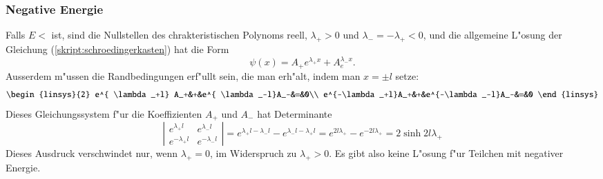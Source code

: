 \subsubsection{Negative Energie}
Falls $E<$ ist, sind die Nullstellen des chrakteristischen
Polynoms reell, $\lambda_+>0$ und $\lambda_-=-\lambda_+ < 0$,
und die allgemeine 
L"osung der Gleichung (\ref{skript:schroedingerkasten}) hat die Form
\[
\psi(x)=A_+e^{\lambda_+x}+A_e^{\lambda_-x}.
\]
Ausserdem m"ussen die Randbedingungen erf"ullt sein, die man erh"alt,
indem man $x=\pm l$ setze:
\[
\begin{linsys}{2}
e^{ \lambda_+l} A_+&+&e^{ \lambda_-l}A_-&=&0\\
e^{-\lambda_+l}A_+&+&e^{-\lambda_-l}A_-&=&0
\end{linsys}
\]
Dieses Gleichungssystem f"ur die Koeffizienten $A_+$ und $A_-$ hat
Determinante
\[
\left|\begin{matrix}
e^{ \lambda_+l}&e^{ \lambda_-l}\\
e^{-\lambda_+l}&e^{-\lambda_-l}
\end{matrix}\right|
=
e^{\lambda_+l-\lambda_-l}-e^{\lambda_-l-\lambda_+l}
=
e^{2l\lambda_+}-e^{-2l\lambda_+}
=
2\sinh 2l\lambda_+
\]
Dieses Ausdruck verschwindet nur, wenn $\lambda_+=0$, im Widerspruch
zu $\lambda_+>0$.
Es gibt also keine L"osung f"ur Teilchen mit negativer Energie.

